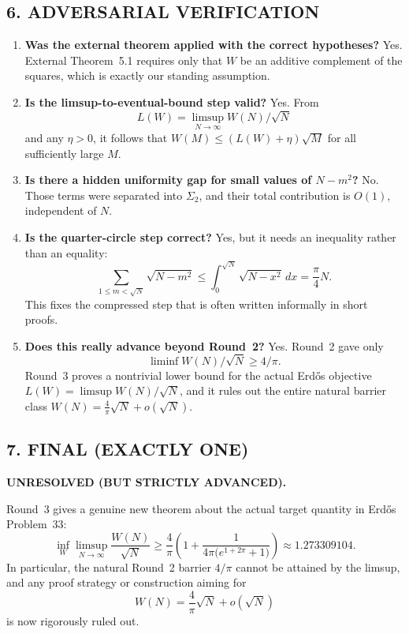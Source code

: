 \subsection*{6. ADVERSARIAL VERIFICATION}

\begin{enumerate}
\item \textbf{Was the external theorem applied with the correct hypotheses?}
Yes. External Theorem~5.1 requires only that \(W\) be an additive complement of the squares, which is exactly our standing assumption.

\item \textbf{Is the limsup-to-eventual-bound step valid?}
Yes. From
\[
L(W)=\limsup_{N\to\infty} W(N)/\sqrt N
\]
and any \(\eta>0\), it follows that \(W(M)\le (L(W)+\eta)\sqrt M\) for all sufficiently large \(M\).

\item \textbf{Is there a hidden uniformity gap for small values of \(N-m^2\)?}
No. Those terms were separated into \(\Sigma_2\), and their total contribution is \(O(1)\), independent of \(N\).

\item \textbf{Is the quarter-circle step correct?}
Yes, but it needs an inequality rather than an equality:
\[
\sum_{1\le m<\sqrt N}\sqrt{N-m^2}
\le \int_0^{\sqrt N}\sqrt{N-x^2}\,dx
=\frac{\pi}{4}N.
\]
This fixes the compressed step that is often written informally in short proofs.

\item \textbf{Does this really advance beyond Round~2?}
Yes. Round~2 gave only
\[
\liminf W(N)/\sqrt N\ge 4/\pi.
\]
Round~3 proves a nontrivial lower bound for the actual Erd\H{o}s objective \(L(W)=\limsup W(N)/\sqrt N\), and it rules out the entire natural barrier class \(W(N)=\frac{4}{\pi}\sqrt N+o(\sqrt N)\).
\end{enumerate}

\subsection*{7. FINAL (EXACTLY ONE)}

\textbf{UNRESOLVED (BUT STRICTLY ADVANCED).}

Round~3 gives a genuine new theorem about the actual target quantity in Erd\H{o}s Problem~33:
\[
\inf_W \limsup_{N\to\infty}\frac{W(N)}{\sqrt N}
\ge \frac{4}{\pi}\left(1+\frac{1}{4\pi\bigl(e^{1+2\pi}+1\bigr)}\right)
\approx 1.273309104.
\]
In particular, the natural Round~2 barrier \(4/\pi\) cannot be attained by the limsup, and any proof strategy or construction aiming for
\[
W(N)=\frac{4}{\pi}\sqrt N+o(\sqrt N)
\]
is now rigorously ruled out.

